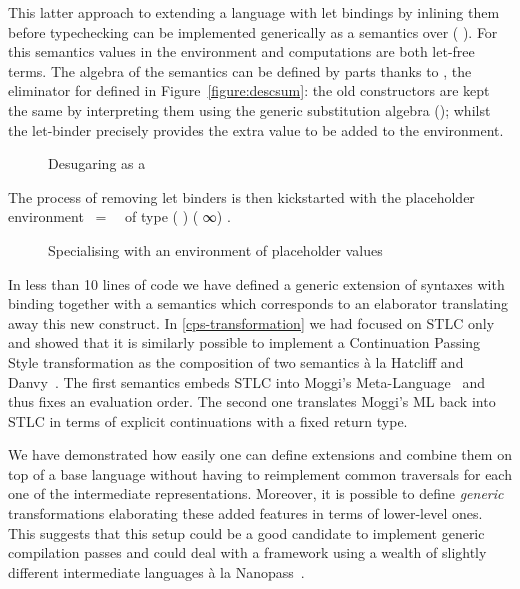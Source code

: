 This latter approach to extending a language  with let bindings
by inlining them before typechecking can be implemented generically as
a semantics over (  ). For this semantics values
in the environment and computations are both let-free terms. The algebra
of the semantics can be defined by parts thanks to , the eliminator
for  defined in Figure~\ref{figure:descsum}:
the old constructors are kept the same by
interpreting them using the generic substitution algebra ();
whilst the let-binder precisely provides the extra value to be added to the
environment.

\begin{figure}[h]
\caption{Desugaring as a \label{defn:UnLet}}
\end{figure}

The process of removing let binders is then kickstarted with the placeholder
environment ~=~~
of type {( ) (  ∞) }.

\begin{figure}[h]
\caption{Specialising  with an environment of placeholder values\label{defn:unlet}}
\end{figure}

In less than 10 lines of code we have defined a generic extension of
syntaxes with binding together with a semantics which corresponds
to an elaborator translating away this new construct.
In \cref{cps-transformation} we had focused on STLC only
and showed that it is similarly possible to implement a Continuation
Passing Style transformation as the composition of two semantics
à la Hatcliff and Danvy~\citeyear{hatcliff1994generic}.
The first semantics embeds STLC into Moggi's
Meta-Language~\citeyear{DBLP:journals/iandc/Moggi91} and thus fixes
an evaluation order. The second one translates Moggi's ML back into
STLC in terms of explicit continuations with a fixed return type.

We have demonstrated how easily one can define extensions and combine
them on top of a base language without having to reimplement common
traversals for each one of the intermediate representations. Moreover,
it is possible to define \emph{generic} transformations elaborating
these added features in terms of lower-level ones. This suggests that
this setup could be a good candidate to implement generic compilation
passes and could deal with a framework using a wealth of slightly
different intermediate languages à la Nanopass~\cite{Keep:2013:NFC:2544174.2500618}.
